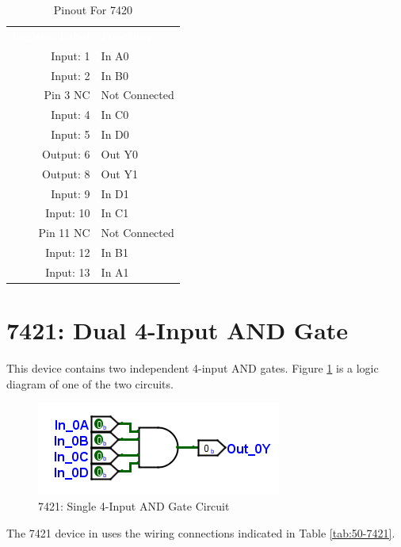 \begin{table}[H]
	\sffamily
	\newcommand{\head}[1]{\textcolor{white}{\textbf{#1}}}		
	\begin{center}
		\begin{tabular}{rl} 
			\rowcolor{black!75}
			\head{Logisim Label} & \head{Function} \\
			Input: 1   & In A0  \\
			Input: 2   & In B0  \\
			Pin 3 NC   & Not Connected \\
			Input: 4   & In C0  \\
			Input: 5   & In D0  \\
			Output: 6  & Out Y0 \\
			Output: 8  & Out Y1 \\
			Input: 9   & In D1  \\
			Input: 10  & In C1  \\
			Pin 11 NC  & Not Connected \\
			Input: 12 & In B1  \\
			Input: 13  & In A1  \\
		\end{tabular}
	\end{center}
	\caption{Pinout For 7420}
	\label{tab:50-7420}
\end{table}

\section{7421: Dual 4-Input AND Gate}

This device contains two independent 4-input AND gates. Figure \ref{fig:50-7421} is a logic diagram of one of the two circuits.

\begin{figure}[H]
	\centering
	\includegraphics{gfx/50-7421}
	\caption{7421: Single 4-Input AND Gate Circuit}
	\label{fig:50-7421}
\end{figure}

The 7421 device in \LE uses the wiring connections indicated in Table \ref{tab:50-7421}.

